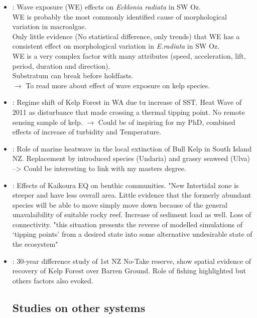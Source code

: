 \documentclass[]{report}
\begin{document}
\begin{itemize}
		\item \cite{wernberg2005effect} : Wave exposure (WE) effects on \textit{Ecklonia radiata} in SW Oz.
		\\WE is probably the most commonly identified cause of morphological variation in macroalgae.
		\\ Only little evidence (No statistical difference, only trends) that WE has a consistent effect on morphological variation in \textit{E.radiata} in SW Oz.
		\\ WE is a very complex factor with many attributes (speed, acceleration, lift, period, duration and direction).
		\\ Substratum can break before holdfasts.
		\\ $\rightarrow$ To read more about effect of wave exposure on kelp species.
		
		\item \cite{wernberg2016} : Regime shift of Kelp Forest in WA due tu increase of SST. Heat Wave of 2011 as disturbance that made crossing a thermal tipping point. No remote sensing sample of kelp. $\rightarrow$ Could be of inspiring for my PhD, combined effects of increase of turbidity and Temperature.
		\item \cite{thomsen2019local} : Role of marine heatwave in the local extinction of Bull Kelp in South Island NZ. Replacement by introduced species (Undaria) and grassy seaweed (Ulva) --> Could be interesting to link with my masters degree.		
		\item \cite{schiel2019kaikoura} : Effects of Kaikoura EQ on benthic communities. "New Intertidal zone is steeper and have less overall area. Little evidence that the formerly abundant species will be able to move simply move down because of the general unavalaibility of suitable rocky reef. Increase of sediment load as well. Loss of connectivity.
		"this situation presents the reverse of modelled simulations of ‘tipping points’ from a desired state into some alternative undesirable state of the ecosystem" 
		\item \cite{leleu2012mapping} : 30-year difference study of 1st NZ No-Take reserve, show spatial evidence of recovery of Kelp Forest over Barren Ground. Role of fishing highlighted but others factors also evoked.

		
		
		\subsection{Studies on other systems}
		

\end{itemize}
\end{document}
